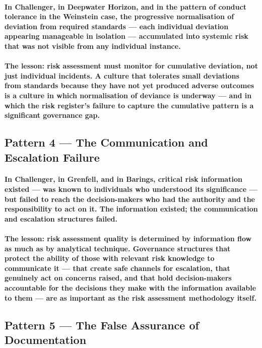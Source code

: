 \paragraph{In Challenger, in Deepwater Horizon, and in the pattern of conduct tolerance in the Weinstein case, the progressive normalisation of deviation from required standards — each individual deviation appearing manageable in isolation — accumulated into systemic risk that was not visible from any individual instance.}
\paragraph{The lesson: \textbf{risk assessment must monitor for cumulative deviation, not just individual incidents}. A culture that tolerates small deviations from standards because they have not yet produced adverse outcomes is a culture in which normalisation of deviance is underway — and in which the risk register's failure to capture the cumulative pattern is a significant governance gap.}

\subsection{Pattern 4 — The Communication and Escalation Failure}
\paragraph{In Challenger, in Grenfell, and in Barings, critical risk information existed — was known to individuals who understood its significance — but failed to reach the decision-makers who had the authority and the responsibility to act on it. The information existed; the communication and escalation structures failed.}
\paragraph{The lesson: \textbf{risk assessment quality is determined by information flow as much as by analytical technique}. Governance structures that protect the ability of those with relevant risk knowledge to communicate it — that create safe channels for escalation, that genuinely act on concerns raised, and that hold decision-makers accountable for the decisions they make with the information available to them — are as important as the risk assessment methodology itself.}

\subsection{Pattern 5 — The False Assurance of Documentation}
